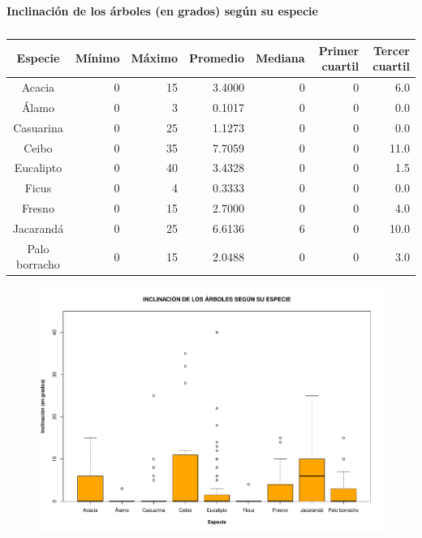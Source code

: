 \documentclass[11pt]{article}
\begin{document}
\begin{table}[h!]
  \begin{center}
    \caption*{\textbf{Inclinación de los árboles (en grados) según su especie}}
    \begin{tabular}{| c | r | r | r | r | r | r |}
      \hline
      \textbf{Especie} & \textbf{Mínimo} & \textbf{Máximo} & \textbf{Promedio} &
      \textbf{Mediana} & \textbf{Primer cuartil} & \textbf{Tercer cuartil}  \\ \hline
      Acacia & 0 & 15 & 3.4000 & 0 & 0 & 6.0 \\ \hline
      Álamo & 0 & 3 & 0.1017 & 0 & 0 & 0.0 \\ \hline
      Casuarina & 0 & 25 & 1.1273 & 0 & 0 & 0.0 \\ \hline
      Ceibo & 0 & 35 & 7.7059 & 0 & 0 & 11.0 \\ \hline
      Eucalipto & 0 & 40 & 3.4328 & 0 & 0 & 1.5 \\ \hline
      Ficus & 0 & 4 & 0.3333 & 0 & 0 & 0.0 \\ \hline
      Fresno & 0 & 15 & 2.7000 & 0 & 0 & 4.0 \\ \hline
      Jacarandá & 0 & 25 & 6.6136 & 6 & 0 & 10.0 \\ \hline
      Palo borracho & 0 & 15 & 2.0488 & 0 & 0 & 3.0 \\ \hline
    \end{tabular}
    \caption{}
    \label{tab:tablaInclinacionEspecie}
  \end{center}
\end{table}

\begin{figure}[h!]
  \begin{center}
    \includegraphics[width=0.9\linewidth]{boxInclinacionEspecie.pdf}
    \caption{}
    \label{fig:boxInclinacionEspecie}
  \end{center}  
\end{figure}
\end{document}

